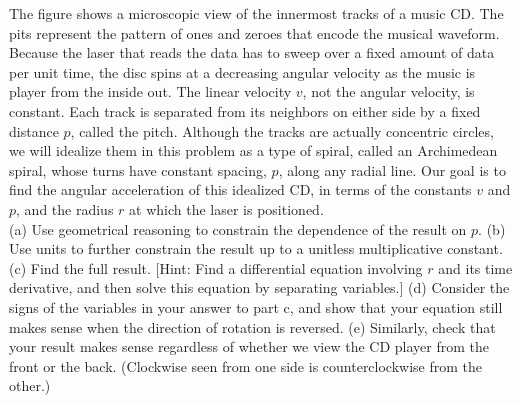 The figure shows a microscopic view of the innermost tracks of a music CD.
The pits represent the pattern of ones and zeroes that encode the musical waveform.
Because the laser that reads the data has to sweep over a fixed amount of data
per unit time, the disc spins at a decreasing angular velocity as the music is
player from the inside out. The linear velocity $v$, not the angular velocity,
is constant. Each track is separated from its neighbors on either side by a fixed distance $p$, called
the pitch. Although the tracks are actually concentric circles, we will idealize
them in this problem as a type of spiral, called an Archimedean spiral,
whose turns have constant spacing, $p$, along any radial line.
Our goal is to find the angular acceleration of this idealized CD, in terms of the constants
$v$ and $p$, and the radius $r$ at which the laser is positioned.\\
(a) Use geometrical reasoning to constrain the dependence of the result on $p$.\hwendpart
(b) Use units to further constrain the result up to a unitless multiplicative constant.\hwendpart
(c) Find the full result. [Hint: Find a differential equation involving $r$ and its time derivative,
and then solve this equation by separating variables.]\answercheck\hwendpart
(d) Consider the signs of the variables in your answer to part c, and show that
your equation still makes sense when the direction of rotation is reversed.\hwendpart
(e) Similarly, check that your result makes sense regardless of whether we view the
CD player from the front or the back. (Clockwise seen from one side is counterclockwise
from the other.)
